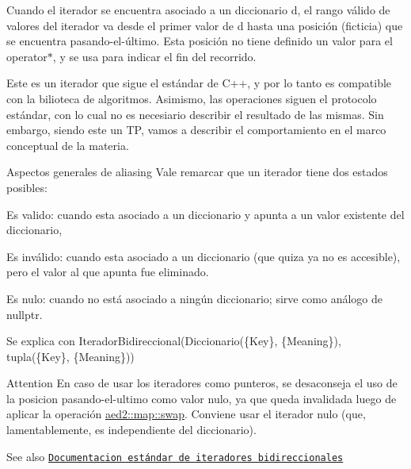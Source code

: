 Cuando el iterador se encuentra asociado a un diccionario {\ttfamily d}, el rango válido de valores del iterador va desde el primer valor de {\ttfamily d} hasta una posición (ficticia) que se encuentra pasando-\/el-\/último. Esta posición no tiene definido un valor para el {\ttfamily operator$\ast$}, y se usa para indicar el fin del recorrido.

Este es un iterador que sigue el estándar de C++, y por lo tanto es compatible con la bilioteca de algoritmos. Asimismo, las operaciones siguen el protocolo estándar, con lo cual no es necesiario describir el resultado de las mismas. Sin embargo, siendo este un TP, vamos a describir el comportamiento en el marco conceptual de la materia.

\begin{DoxyParagraph}{Aspectos generales de aliasing}
Vale remarcar que un iterador tiene dos estados posibles\+:
\begin{DoxyEnumerate}
\item Es valido\+: cuando esta asociado a un diccionario y apunta a un valor existente del diccionario,
\item Es inválido\+: cuando esta asociado a un diccionario (que quiza ya no es accesible), pero el valor al que apunta fue eliminado.
\item Es nulo\+: cuando no está asociado a ningún diccionario; sirve como análogo de {\ttfamily nullptr}. 
\end{DoxyEnumerate}
\end{DoxyParagraph}


\begin{DoxyParagraph}{Se explica con}
Iterador\+Bidireccional(Diccionario(\{Key\}, \{Meaning\}), tupla(\{Key\}, \{Meaning\}))
\end{DoxyParagraph}
\begin{DoxyAttention}{Attention}
En caso de usar los iteradores como punteros, se desaconseja el uso de la posicion pasando-\/el-\/ultimo como valor nulo, ya que queda invalidada luego de aplicar la operación \hyperlink{classaed2_1_1map_a43ddb71cc91e5c6021a7a1f243d6cc4a}{aed2\+::map\+::swap}. Conviene usar el iterador nulo (que, lamentablemente, es independiente del diccionario).
\end{DoxyAttention}
\begin{DoxySeeAlso}{See also}
\href{http://en.cppreference.com/w/cpp/concept/BidirectionalIterator}{\tt Documentacion estándar de iteradores bidireccionales} 
\end{DoxySeeAlso}


